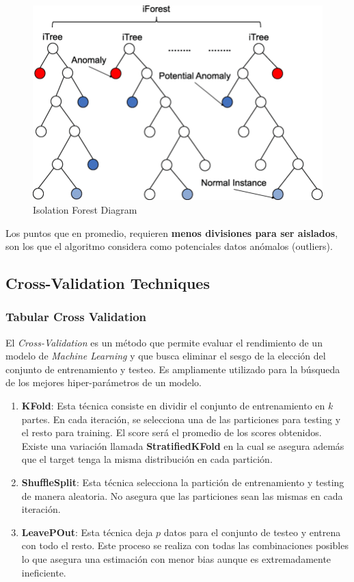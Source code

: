 \begin{figure}[H]
    \center
    \includegraphics[scale=0.3]{notebooks/Others/img/isolation_forest_diagram.png}
    \caption{Isolation Forest Diagram}
\end{figure}

Los puntos que en promedio, requieren \textbf{menos divisiones para ser aislados}, son los que el algoritmo considera como potenciales datos anómalos (outliers).

\subsection{Cross-Validation Techniques}

\subsubsection{Tabular Cross Validation}

El \textit{Cross-Validation} es un método que permite evaluar el rendimiento de un modelo de \textit{Machine Learning} y que busca eliminar el sesgo de la elección del conjunto de entrenamiento y testeo. Es ampliamente utilizado para la búsqueda de los mejores hiper-parámetros de un modelo. 

\begin{enumerate}
    \item \textbf{KFold}: Esta técnica consiste en dividir el conjunto de entrenamiento en $k$ partes. En cada iteración, se selecciona una de las particiones para testing y el resto para training. El score será el promedio de los scores obtenidos. Existe una variación llamada \textbf{StratifiedKFold} en la cual se asegura además que el target tenga la misma distribución en cada partición.
    \item \textbf{ShuffleSplit}: Esta técnica selecciona la partición de entrenamiento y testing de manera aleatoria. No asegura que las particiones sean las mismas en cada iteración. 
    \item \textbf{LeavePOut}: Esta técnica deja $p$ datos para el conjunto de testeo y entrena con todo el resto. Este proceso se realiza con todas las combinaciones posibles lo que asegura una estimación con menor bias aunque es extremadamente ineficiente. 
\end{enumerate}

